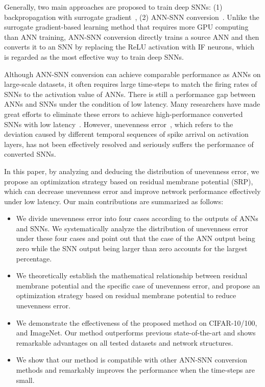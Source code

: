 \documentclass[letterpaper]{article} %
\begin{document}
Generally, two main approaches are proposed to train deep SNNs: (1) backpropagation with surrogate gradient~\cite{neftci2019surrogate,kim2020unifying}, (2) ANN-SNN conversion~\cite{cao2015spiking,rueckauer2016theory}. Unlike the surrogate gradient-based learning method that requires more GPU computing than ANN training, ANN-SNN conversion directly trains a source ANN and then converts it to an SNN by replacing the ReLU activation with IF neurons, which is regarded as the most effective way to train deep SNNs. 

Although ANN-SNN conversion can achieve comparable performance as ANNs on large-scale datasets, it often requires large time-steps to match the firing rates of SNNs to the activation value of ANNs. There is still a performance gap between ANNs and SNNs under the condition of low latency. Many researchers have made great efforts to eliminate these errors to achieve high-performance converted SNNs with low latency~\cite{han2020rmp,ding2021optimal,ho2021tcl,deng2020optimal,li2021free,li2022quantization}. However, unevenness error~\cite{bu2022optimal}, which refers to the deviation caused by different temporal sequences of spike arrival on activation layers, has not been effectively resolved and seriously suffers the performance of converted SNNs. 

In this paper, by analyzing and deducing the distribution of unevenness error, we propose an optimization strategy based on residual membrane potential (SRP), which can decrease unevenness error and improve network performance effectively under low latency. Our main contributions are summarized as follows:
\begin{itemize}
    \item[1] We divide unevenness error into four cases according to the outputs of ANNs and SNNs. We systematically analyze the distribution of unevenness error under these four cases and point out that the case of the ANN output being zero while the SNN output being larger than zero accounts for the largest percentage.
    \item[2] We theoretically establish the mathematical relationship between residual membrane potential and the specific case of unevenness error, and propose an optimization strategy based on residual membrane potential to reduce unevenness error.
    \item[3] We demonstrate the effectiveness of the proposed method on CIFAR-10/100, and ImageNet. Our method outperforms previous state-of-the-art and shows remarkable advantages on all tested datasets and network structures.
     \item[4] We show that our method is compatible with other ANN-SNN conversion methods and remarkably improves the performance when the time-steps are small.
\end{itemize}
\end{document}

